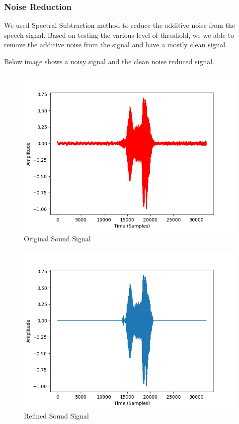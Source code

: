 \subsubsection{Noise Reduction}

We used Spectral Subtraction method to reduce the additive noise from the speech signal. Based on testing the various level of threshold, we we able to remove the additive noise from the signal and have a mostly clean signal.


Below image shows a noisy signal and the clean noise reduced signal.

\begin{figure}[H]
	\begin{center}
		\includegraphics[scale=0.8]{images/mainSigOriginal.png}
		\caption{Original Sound Signal}
		\label{original sound}
	\end{center}
\end{figure}

\begin{figure}[H]
	\begin{center}
		\includegraphics[scale=0.8]{images/mainSigRefine.png}
		\caption{Refined Sound Signal}
		\label{refined sound}
	\end{center}
\end{figure}



